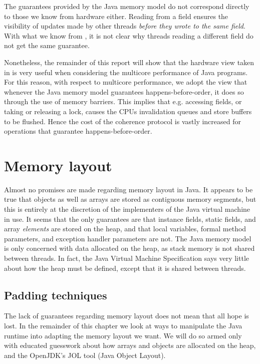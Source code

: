 The guarantees provided by the Java memory model do not correspond directly to
those we know from hardware either. Reading from a  field ensures
the visibility of updates made by other threads \textit{before they wrote to the
same field}. With what we know from \cite{mckenny-barriers}, it is not clear why
threads reading a different  field do not get the same guarantee.

Nonetheless, the remainder of this report will show that the hardware view taken
in \cite{mckenny-barriers} is very useful when considering the multicore
performance of Java programs. For this reason, with respect to multicore performance, we adopt
the view that whenever the Java memory model guarantees happens-before-order, it
does so through the use of memory barriers. This implies that e.g. accessing
 fields, or taking or releasing a lock, causes the CPUs
invalidation queues and store buffers to be flushed. Hence the cost of the
coherence protocol is vastly increased for operations that guarantee
happens-before-order.

\section{Memory layout} Almost no promises are made regarding memory layout in
Java. It appears to be true that objects as well as arrays are stored as
contiguous memory segments,
but this is entirely at the discretion of the implementers of the Java virtual
machine in use. It seems that the only guarantees are that instance
fields, static fields, and array \textit{elements} are stored on the heap, and
that local variables, formal method parameters, and exception handler parameters
are not\cite[chapter~17]{javaspec}\cite[chapter~2]{jvmspec}. The Java memory
model is only concerned with data allocated on the heap, as stack memory is not
shared between threads. In fact, the Java Virtual Machine
Specification\cite{jvmspec} says very little about how the heap must be defined,
except that it is shared between threads.

\subsection{Padding techniques}
The lack of guarantees regarding memory layout does not mean that all hope is
lost. In the remainder of this chapter we look at ways to manipulate the Java
runtime into adapting the memory layout we want. We will do so armed only with
educated guesswork about how arrays and objects are allocated on the heap, and
the OpenJDK's JOL tool (Java Object Layout).

